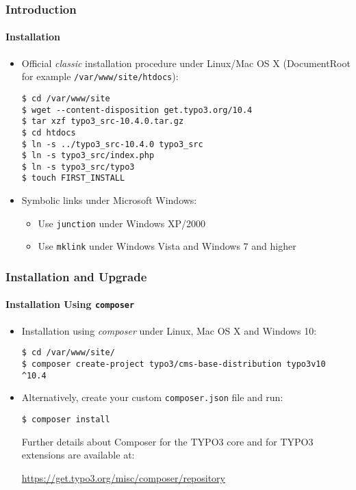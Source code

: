 
\begin{frame}[fragile]
	\frametitle{Introduction}
	\framesubtitle{Installation}

	\begin{itemize}
		\item Official \textit{classic} installation procedure under Linux/Mac OS X\newline
			(DocumentRoot for example \texttt{/var/www/site/htdocs}):
\begin{lstlisting}
$ cd /var/www/site
$ wget --content-disposition get.typo3.org/10.4
$ tar xzf typo3_src-10.4.0.tar.gz
$ cd htdocs
$ ln -s ../typo3_src-10.4.0 typo3_src
$ ln -s typo3_src/index.php
$ ln -s typo3_src/typo3
$ touch FIRST_INSTALL
\end{lstlisting}

		\item Symbolic links under Microsoft Windows:

			\begin{itemize}
				\item Use \texttt{junction} under Windows XP/2000
				\item Use \texttt{mklink} under Windows Vista and Windows 7 and higher
			\end{itemize}

	\end{itemize}
\end{frame}


\begin{frame}[fragile]
	\frametitle{Installation and Upgrade}
	\framesubtitle{Installation Using \texttt{composer}}

	\begin{itemize}
		\item Installation using \textit{composer} under Linux, Mac OS X and Windows 10:
\begin{lstlisting}
$ cd /var/www/site/
$ composer create-project typo3/cms-base-distribution typo3v10 ^10.4
\end{lstlisting}

		\item Alternatively, create your custom \texttt{composer.json} file and run:
\begin{lstlisting}
$ composer install
\end{lstlisting}

			Further details about Composer for the TYPO3 core and for TYPO3 extensions
			are available at:

			\small
				\href{https://get.typo3.org/misc/composer/repository}{https://get.typo3.org/misc/composer/repository}
			\normalsize

	\end{itemize}
\end{frame}

